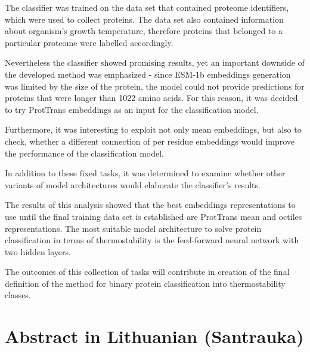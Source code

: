 \documentclass[12pt]{article}
\begin{document}
    The classifier was trained on the data set 
	\cite{engqvist_martin_karl_magnus_2018_1175609} that contained 
	proteome identifiers, which were used 
    to collect proteins. The data set also contained information 
	about organism's growth temperature, therefore proteins that 
	belonged to a particular proteome were labelled accordingly. 

    Nevertheless the classifier showed promising results, yet an
    important downside of the developed method was emphasized -
    since ESM-1b embeddings generation was limited by the size 
    of the protein, the model could not provide predictions for 
    proteins that were longer than 1022 amino acids. For this 
    reason, it was decided to try ProtTrans 
	\cite{elnaggar2020prottrans} embeddings as an 
    input for the classification model.

    Furthermore, it was interesting to exploit not only mean 
    embeddings, but also to check, whether a different 
    connection of per residue embeddings would improve the 
    performance of the classification model.

    In addition to these fixed tasks, it was determined to 
    examine whether other variants of model architectures 
    would elaborate the classifier's results.

	The results of this analysis showed that the best embeddings 
	representations to use until the final training data set is 
	established are ProtTrans mean and octiles representations. 
	The most suitable model architecture to solve protein 
	classification in terms of thermostability is the feed-forward 
	neural network with two hidden layers.

    The outcomes of this collection of tasks will 
    contribute in creation of the final definition of the method
    for binary protein classification into thermostability 
    classes.

	\normalsize

	\newpage

	\section{Abstract in Lithuanian (Santrauka)}
\end{document}
